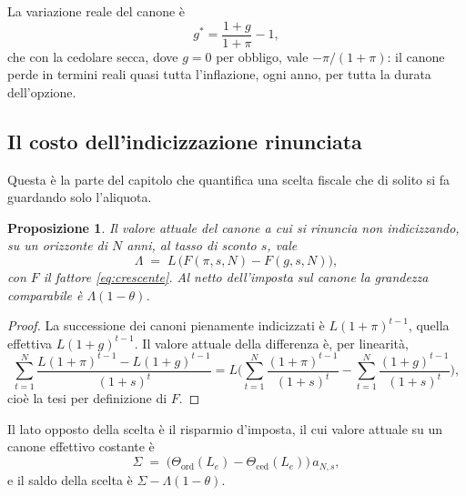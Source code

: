 \documentclass[11pt,a4paper]{article}
\theoremstyle{definition}
\theoremstyle{plain}
\newtheorem{proposizione}[definizione]{Proposizione}
\begin{document}
La variazione reale del canone è
\begin{equation}
g^* = \frac{1+g}{1+\pi}-1,
\label{eq:canone-reale}
\end{equation}
che con la cedolare secca, dove $g=0$ per obbligo, vale $-\pi/(1+\pi)$: il canone perde in termini reali quasi tutta l'inflazione, ogni anno, per tutta la durata dell'opzione.

\subsection{Il costo dell'indicizzazione rinunciata}

Questa è la parte del capitolo che quantifica una scelta fiscale che di solito si fa guardando solo l'aliquota.

\begin{proposizione}
Il valore attuale del canone a cui si rinuncia non indicizzando, su un orizzonte di $N$ anni, al tasso di sconto $s$, vale
\begin{equation}
\Lambda \;=\; L\,\Big(F(\pi,s,N) - F(g,s,N)\Big),
\label{eq:rinuncia}
\end{equation}
con $F$ il fattore \eqref{eq:crescente}. Al netto dell'imposta sul canone la grandezza comparabile è $\Lambda(1-\theta)$.
\end{proposizione}

\begin{proof}
La successione dei canoni pienamente indicizzati è $L(1+\pi)^{t-1}$, quella effettiva $L(1+g)^{t-1}$. Il valore attuale della differenza è, per linearità,
\[
\sum_{t=1}^{N}\frac{L(1+\pi)^{t-1} - L(1+g)^{t-1}}{(1+s)^t}
= L\Big(\sum_{t=1}^{N}\frac{(1+\pi)^{t-1}}{(1+s)^t} - \sum_{t=1}^{N}\frac{(1+g)^{t-1}}{(1+s)^t}\Big),
\]
cioè la tesi per definizione di $F$.
\end{proof}

Il lato opposto della scelta è il risparmio d'imposta, il cui valore attuale su un canone effettivo costante è
\begin{equation}
\Sigma \;=\; \big(\Theta_{\text{ord}}(L_e) - \Theta_{\text{ced}}(L_e)\big)\,a_{N,s},
\label{eq:risparmio}
\end{equation}
e il saldo della scelta è $\Sigma - \Lambda(1-\theta)$.
\end{document}
